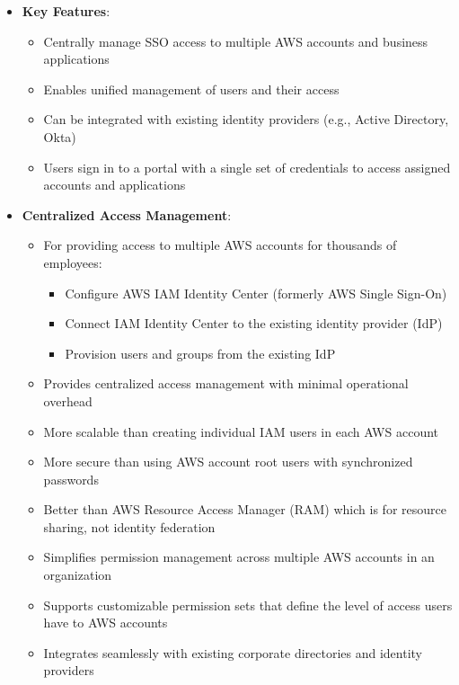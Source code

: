 \documentclass[11pt,a4paper]{report}
\begin{document}
\begin{itemize}
  \item \textbf{Key Features}:
\begin{itemize}
  \item Centrally manage SSO access to multiple AWS accounts and business applications
  \item Enables unified management of users and their access
  \item Can be integrated with existing identity providers (e.g., Active Directory, Okta)
  \item Users sign in to a portal with a single set of credentials to access assigned accounts and applications
\end{itemize}
  \item \textbf{Centralized Access Management}:
\begin{itemize}
  \item For providing access to multiple AWS accounts for thousands of employees:
\begin{itemize}
  \item Configure AWS IAM Identity Center (formerly AWS Single Sign-On)
  \item Connect IAM Identity Center to the existing identity provider (IdP)
  \item Provision users and groups from the existing IdP
\end{itemize}
  \item Provides centralized access management with minimal operational overhead
  \item More scalable than creating individual IAM users in each AWS account
  \item More secure than using AWS account root users with synchronized passwords
  \item Better than AWS Resource Access Manager (RAM) which is for resource sharing, not identity federation
  \item Simplifies permission management across multiple AWS accounts in an organization
  \item Supports customizable permission sets that define the level of access users have to AWS accounts
  \item Integrates seamlessly with existing corporate directories and identity providers
\end{itemize}
\end{itemize}
\end{document}
